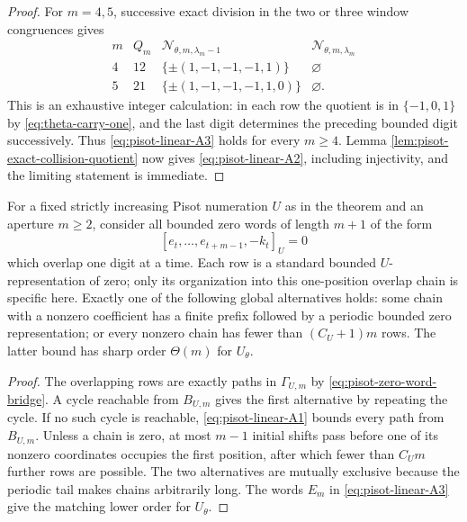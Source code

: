 \begin{proof}
For $m=4,5$, successive exact division in the two or three window
congruences gives
\[
\begin{array}{c|c|c|c}
m&Q_m&\mathcal N_{\theta,m,\lambda_m-1}
&\mathcal N_{\theta,m,\lambda_m}\\ \hline
4&12&\{\pm(1,-1,-1,-1,1)\}&\varnothing\\
5&21&\{\pm(1,-1,-1,-1,1,0)\}&\varnothing.
\end{array}
\]
This is an exhaustive integer calculation: in each row the quotient is in
$\{-1,0,1\}$ by \eqref{eq:theta-carry-one}, and the last digit determines
the preceding bounded digit successively.  Thus \eqref{eq:pisot-linear-A3}
holds for every $m\ge4$.  Lemma
\ref{lem:pisot-exact-collision-quotient} now gives
\eqref{eq:pisot-linear-A2}, including injectivity, and the limiting statement
is immediate.
\end{proof}

\begin{corollary}
\label{cor:pisot-zero-strip-synchronization}
For a fixed strictly increasing Pisot numeration $U$ as in the theorem and an
aperture $m\ge2$,
consider all bounded zero words of length $m+1$ of the form
\[
[e_t,\ldots,e_{t+m-1},-k_t]_U=0
\]
which overlap one digit at a time.  Each row is a standard bounded
$U$-representation of zero; only its organization into this one-position
overlap chain is specific here.  Exactly one of the following global
alternatives holds: some chain with a nonzero coefficient has a finite prefix
followed by a periodic bounded zero representation; or every nonzero chain
has fewer than $(C_U+1)m$ rows.  The latter bound has sharp order $\Theta(m)$
for $U_\theta$.
\end{corollary}

\begin{proof}
The overlapping rows are exactly paths in $\Gamma_{U,m}$ by
\eqref{eq:pisot-zero-word-bridge}.  A cycle reachable from $B_{U,m}$ gives
the first alternative by repeating the cycle.  If no such cycle is
reachable, \eqref{eq:pisot-linear-A1} bounds every path from $B_{U,m}$.
Unless a chain is zero, at most $m-1$ initial shifts pass before one of its
nonzero coordinates occupies the first position, after which fewer than
$C_Um$ further rows are possible.  The two alternatives are mutually
exclusive because the periodic tail makes chains arbitrarily long.  The
words $E_m$ in \eqref{eq:pisot-linear-A3} give the matching lower order for
$U_\theta$.
\end{proof}

